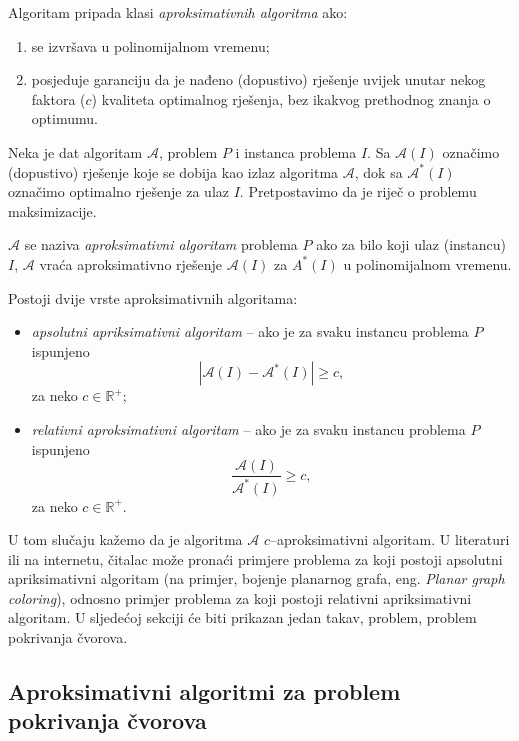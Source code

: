 \documentclass[a4paper, utf8, 11pt, colorlinks]{book}
\begin{document}
  \noindent Algoritam pripada klasi \emph{aproksimativnih algoritma} ako:
  \begin{enumerate}
  	\item se izvršava u polinomijalnom vremenu;
  	\item posjeduje garanciju da je nađeno (dopustivo) rješenje uvijek unutar nekog faktora ($c$) kvaliteta optimalnog rješenja, bez ikakvog prethodnog znanja o optimumu.
  \end{enumerate}
  Neka je dat algoritam $\mathcal{A}$, problem $P$ i instanca problema $I$. Sa $\mathcal{A}(I)$ označimo (dopustivo) rješenje koje se dobija kao izlaz algoritma $\mathcal{A}$, dok sa $\mathcal{A}^*(I)$ označimo optimalno rješenje za ulaz $I$. Pretpostavimo da je riječ o problemu maksimizacije. 
  
  $\mathcal{A}$ se naziva \emph{aproksimativni algoritam} problema $P$ ako 
  za bilo koji ulaz (instancu) $I$, $\mathcal{A}$ vraća aproksimativno rješenje $\mathcal{A}(I)$ za $A^*(I)$ u polinomijalnom vremenu. 
  
  Postoji dvije vrste aproksimativnih algoritama:
  \begin{itemize}
  	\item \emph{apsolutni apriksimativni algoritam} -- ako je za svaku instancu problema $P$ ispunjeno
  	$$ |\mathcal{A}(I) - \mathcal{A}^*(I)| \geq c,$$ za neko $c\in \mathbb{R}^+$;
  	\item \emph{relativni aproksimativni algoritam} -- ako je   za svaku instancu problema $P$ ispunjeno
  	$$\frac{\mathcal{A}(I)}{\mathcal{A}^*(I)} \geq c,$$ za neko $c\in \mathbb{R}^+$.
  \end{itemize}
  
  \noindent U tom slučaju kažemo da je algoritma $\mathcal{A}$ $c$--aproksimativni algoritam. U literaturi ili na internetu, čitalac može pronaći primjere problema za koji postoji apsolutni apriksimativni algoritam (na primjer, bojenje planarnog grafa, eng. \emph{Planar graph coloring}), odnosno primjer problema za koji postoji relativni apriksimativni algoritam. U sljedećoj sekciji će biti prikazan jedan takav, problem,  problem pokrivanja čvorova. 
  
  \subsection{Aproksimativni algoritmi za problem pokrivanja čvorova}
  
\end{document}
